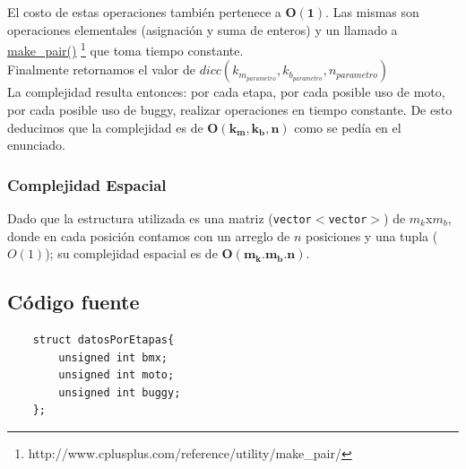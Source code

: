 El costo de estas operaciones tambi\'en pertenece a $\mathbf{O(1)}$. Las mismas son operaciones elementales (asignaci\'on y suma de enteros) y un llamado a  \href{http://www.cplusplus.com/reference/utility/make_pair/}{make\_pair()} \footnote{http://www.cplusplus.com/reference/utility/make_pair/} que toma tiempo constante.\\



Finalmente retornamos el valor de $dicc(k_{m_{parametro}},k_{b_{parametro}},n_{parametro})$\\

La complejidad resulta entonces: por cada etapa, por cada posible uso de moto, por cada posible uso de buggy, realizar operaciones en tiempo constante. De esto deducimos que la complejidad es de $\mathbf{O(k_{m},k_{b},n)}$ como se ped\'ia en el enunciado.

\subsubsection{Complejidad Espacial}
Dado que la estructura utilizada es una matriz (\texttt{vector$<$vector$>$}) de $m_k$x$m_b$, donde en cada posici\'on contamos con un arreglo de $n$ posiciones y una tupla ($O(1)$); su complejidad espacial es de $\mathbf{O(m_k.m_b.n)}$.

\newpage
\subsection{C\'odigo fuente}
	\begin{codesnippet}
	\begin{verbatim}
    struct datosPorEtapas{
        unsigned int bmx;
        unsigned int moto;
        unsigned int buggy;
    };
	\end{verbatim}
	\end{codesnippet}

